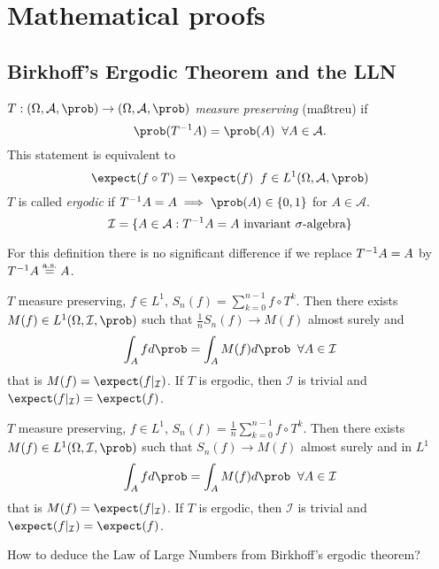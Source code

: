 \documentclass[mfit.tex]{subfiles}
\begin{document}
\section{Mathematical proofs}

\subsection{Birkhoff's Ergodic Theorem and the LLN}

\begin{defi*}
  $T: (\Omega,\mathcal{A},\prob) \to (\Omega,\mathcal{A},\prob)$ \emph{measure preserving} (maßtreu) if
  \[ \prob(\inv{T} A) = \prob(A) \;\; \forall A \in \mathcal{A} \text{.} \]
  This statement is equivalent to
  \[ \expect(f \circ T) = \expect(f) \;\; f \in L^1(\Omega,\mathcal{A},\prob) \]
  $T$ is called \emph{ergodic} if $\inv{T}A = A \implies \prob(A) \in \{0,1\}$ for $A \in \mathcal{A}$.
  \[ \mathcal{I} = \{ A \in \mathcal{A}: {T}^{-1}A = A \text{ invariant } \sigma \text{-algebra} \} \]
\end{defi*}

\begin{rem}
  For this definition there is no significant difference if we replace ${T}^{-1}A=A$ by ${T}^{-1}A \overset{\text{a.s.}}{=}A$.
\end{rem}

\begin{theorem}
  $T$ measure preserving, $f \in L^1$, $S_n(f) = \sum_{k=0}^{n-1} f \circ T^k$.
  Then there exists $M(f) \in L^1(\Omega,\mathcal{I},\prob)$ such that $\frac{1}{n} S_n(f) \to M(f)$ almost surely and 
  \[ \int_A f d\prob = \int_A M(f) d\prob \;\; \forall A \in \mathcal{I} \]
  that is $M(f) = \expect(f|_\mathcal{I})$.
  If $T$ is ergodic, then $\mathcal{I}$ is trivial and $\expect(f|_\mathcal{I}) = \expect(f)$.
\end{theorem}

\begin{theorem}
  $T$ measure preserving, $f \in L^1$, $S_n(f) = \frac{1}{n} \sum_{k=0}^{n-1} f \circ T^k$.
  Then there exists $M(f) \in L^1(\Omega,\mathcal{I},\prob)$ such that $S_n(f) \to M(f)$ almost surely and in $L^1$
  \[ \int_A f d\prob = \int_A M(f) d\prob \;\; \forall A \in \mathcal{I} \]
  that is $M(f) = \expect(f|_\mathcal{I})$.
  If $T$ is ergodic, then $\mathcal{I}$ is trivial and $\expect(f|_\mathcal{I}) = \expect(f)$.
\end{theorem}

How to deduce the Law of Large Numbers from Birkhoff's ergodic theorem?
\end{document}

